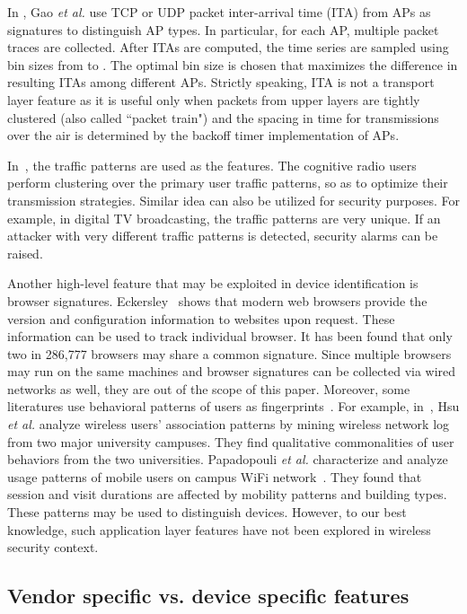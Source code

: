 \documentclass[journal,draftcls,onecolumn,11pt]{IEEEtran}
\begin{document}
In \cite{Gao}, Gao {\it et al.} use TCP or UDP packet inter-arrival time (ITA) from APs as signatures to distinguish AP types. In particular, for each AP, multiple packet traces are collected. After ITAs are computed, the time series are sampled using bin sizes from  to . The optimal bin size is chosen that maximizes the difference in resulting ITAs among different APs. Strictly speaking, ITA is not a transport layer feature as it is useful only when packets from upper layers are tightly clustered (also called ``packet train") and the spacing in time for transmissions over the air is determined by the backoff timer implementation of APs.

In~\cite{M.EjazAhmed2014}, the traffic patterns are used as the features. The cognitive radio users perform clustering over the primary user traffic patterns, so as to optimize their transmission strategies. Similar idea can also be utilized for security purposes. For example, in digital TV broadcasting, the traffic patterns are very unique. If an attacker with very different traffic patterns is detected, security alarms can be raised.

Another high-level feature that may be exploited in device identification is browser signatures. Eckersley~\cite{Eckersley} shows that modern web browsers provide the version and configuration information  to websites upon request. These information can be used to track individual browser. It has been found that only two in 286,777 browsers may share a common signature. Since multiple browsers may run on the same machines and browser signatures can be collected via wired networks as well, they are out of the scope of this paper. Moreover, some literatures use behavioral patterns of users as fingerprints~\cite{Hsu2007,papadopouli2005characterizing}. For example, in~\cite{Hsu2007}, Hsu {\it et al.} analyze wireless users' association patterns by mining wireless network log from two major university campuses. They  find qualitative commonalities of user behaviors from the two universities. Papadopouli {\it et al.} characterize and analyze usage patterns of mobile users on campus WiFi network~\cite{papadopouli2005characterizing}. They found that session and visit durations are affected by mobility patterns and building types. These patterns may be used to distinguish devices. However, to our best knowledge, such application layer features have not been explored in wireless security context.

\subsection{Vendor specific vs. device specific features}
\end{document}
